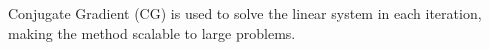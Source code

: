 \documentclass{article}
\begin{document}
Conjugate Gradient (CG) is used to solve the linear system in each iteration, making the method scalable to large problems.


\end{document}
